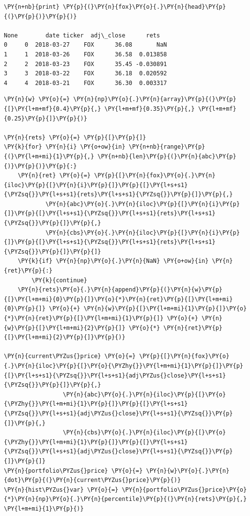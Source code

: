 \begin{Answer}
\begin{codebox}[size=fbox, boxrule=1pt, colback=cellbackground, colframe=cellborder]
\begin{Verbatim}[commandchars=\\\{\}]
\PY{n+nb}{print} \PY{p}{(}\PY{n}{fox}\PY{o}{.}\PY{n}{head}\PY{p}{(}\PY{p}{)}\PY{p}{)}

None        date ticker  adj\_close      rets
0     0  2018-03-27    FOX      36.08       NaN
1     1  2018-03-26    FOX      36.58  0.013858
2     2  2018-03-23    FOX      35.45 -0.030891
3     3  2018-03-22    FOX      36.18  0.020592
4     4  2018-03-21    FOX      36.30  0.003317
\end{Verbatim}
\end{codebox}

\begin{codebox}[size=fbox, boxrule=1pt, colback=cellbackground, colframe=cellborder]
\begin{Verbatim}[commandchars=\\\{\}]
\PY{n}{w} \PY{o}{=} \PY{n}{np}\PY{o}{.}\PY{n}{array}\PY{p}{(}\PY{p}{[}\PY{l+m+mf}{0.4}\PY{p}{,} \PY{l+m+mf}{0.35}\PY{p}{,} \PY{l+m+mf}{0.25}\PY{p}{]}\PY{p}{)}
		
\PY{n}{rets} \PY{o}{=} \PY{p}{[}\PY{p}{]}
\PY{k}{for} \PY{n}{i} \PY{o+ow}{in} \PY{n+nb}{range}\PY{p}{(}\PY{l+m+mi}{1}\PY{p}{,} \PY{n+nb}{len}\PY{p}{(}\PY{n}{abc}\PY{p}{)}\PY{p}{)}\PY{p}{:}
    \PY{n}{ret} \PY{o}{=} \PY{p}{[}\PY{n}{fox}\PY{o}{.}\PY{n}{iloc}\PY{p}{[}\PY{n}{i}\PY{p}{]}\PY{p}{[}\PY{l+s+s1}{\PYZsq{}}\PY{l+s+s1}{rets}\PY{l+s+s1}{\PYZsq{}}\PY{p}{]}\PY{p}{,}
            \PY{n}{abc}\PY{o}{.}\PY{n}{iloc}\PY{p}{[}\PY{n}{i}\PY{p}{]}\PY{p}{[}\PY{l+s+s1}{\PYZsq{}}\PY{l+s+s1}{rets}\PY{l+s+s1}{\PYZsq{}}\PY{p}{]}\PY{p}{,}
            \PY{n}{cbs}\PY{o}{.}\PY{n}{iloc}\PY{p}{[}\PY{n}{i}\PY{p}{]}\PY{p}{[}\PY{l+s+s1}{\PYZsq{}}\PY{l+s+s1}{rets}\PY{l+s+s1}{\PYZsq{}}\PY{p}{]}\PY{p}{]}
    \PY{k}{if} \PY{n}{np}\PY{o}{.}\PY{n}{NaN} \PY{o+ow}{in} \PY{n}{ret}\PY{p}{:}
        \PY{k}{continue}
    \PY{n}{rets}\PY{o}{.}\PY{n}{append}\PY{p}{(}\PY{n}{w}\PY{p}{[}\PY{l+m+mi}{0}\PY{p}{]}\PY{o}{*}\PY{n}{ret}\PY{p}{[}\PY{l+m+mi}{0}\PY{p}{]} \PY{o}{+} \PY{n}{w}\PY{p}{[}\PY{l+m+mi}{1}\PY{p}{]}\PY{o}{*}\PY{n}{ret}\PY{p}{[}\PY{l+m+mi}{1}\PY{p}{]} \PY{o}{+} \PY{n}{w}\PY{p}{[}\PY{l+m+mi}{2}\PY{p}{]} \PY{o}{*} \PY{n}{ret}\PY{p}{[}\PY{l+m+mi}{2}\PY{p}{]}\PY{p}{)}
			
\PY{n}{current\PYZus{}price} \PY{o}{=} \PY{p}{[}\PY{n}{fox}\PY{o}{.}\PY{n}{iloc}\PY{p}{[}\PY{o}{\PYZhy{}}\PY{l+m+mi}{1}\PY{p}{]}\PY{p}{[}\PY{l+s+s1}{\PYZsq{}}\PY{l+s+s1}{adj\PYZus{}close}\PY{l+s+s1}{\PYZsq{}}\PY{p}{]}\PY{p}{,} 
                 \PY{n}{abc}\PY{o}{.}\PY{n}{iloc}\PY{p}{[}\PY{o}{\PYZhy{}}\PY{l+m+mi}{1}\PY{p}{]}\PY{p}{[}\PY{l+s+s1}{\PYZsq{}}\PY{l+s+s1}{adj\PYZus{}close}\PY{l+s+s1}{\PYZsq{}}\PY{p}{]}\PY{p}{,}
                 \PY{n}{cbs}\PY{o}{.}\PY{n}{iloc}\PY{p}{[}\PY{o}{\PYZhy{}}\PY{l+m+mi}{1}\PY{p}{]}\PY{p}{[}\PY{l+s+s1}{\PYZsq{}}\PY{l+s+s1}{adj\PYZus{}close}\PY{l+s+s1}{\PYZsq{}}\PY{p}{]}\PY{p}{]}
\PY{n}{portfolio\PYZus{}price} \PY{o}{=} \PY{n}{w}\PY{o}{.}\PY{n}{dot}\PY{p}{(}\PY{n}{current\PYZus{}price}\PY{p}{)}
\PY{n}{hist\PYZus{}var} \PY{o}{=} \PY{n}{portfolio\PYZus{}price}\PY{o}{*}\PY{n}{np}\PY{o}{.}\PY{n}{percentile}\PY{p}{(}\PY{n}{rets}\PY{p}{,} \PY{l+m+mi}{1}\PY{p}{)}


\end{Verbatim}
\end{codebox}
\end{Answer}
